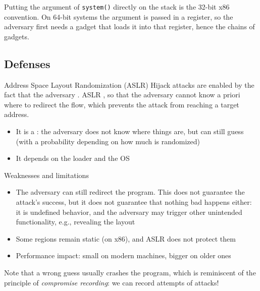 \begin{framedremark}
    Putting the argument of \texttt{system()} directly on the stack is the 32-bit x86 convention. On 64-bit systems the argument is passed in a register, so the adversary first needs a gadget that loads it into that register, hence the chains of gadgets.
\end{framedremark}

\subsection{Defenses}
\begin{parag}{Address Space Layout Randomization (ASLR)}
    Hijack attacks are enabled by the fact that the adversary . ASLR , so that the adversary cannot know a priori where to redirect the flow, which prevents the attack from reaching a target address.
    \begin{itemize}
        \item It is a : the adversary does not know where things are, but can still guess (with a probability depending on how much is randomized)
        \item It depends on the loader and the OS
    \end{itemize}
    \begin{subparag}{Weaknesses and limitations}
        \begin{itemize}
            \item The adversary can still redirect the program. This does not guarantee the attack's success, but it does not guarantee that nothing bad happens either: it is undefined behavior, and the adversary may trigger other unintended functionality, e.g.,  revealing the layout
            \item Some regions remain static (on x86), and ASLR does not protect them
            \item Performance impact: small on modern machines, bigger on older ones
        \end{itemize}
        Note that a wrong guess usually crashes the program, which is reminiscent of the principle of \textit{compromise recording}: we can record attempts of attacks!
    \end{subparag}
\end{parag}

